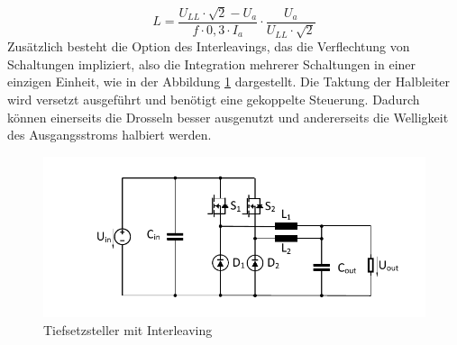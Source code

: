 		\begin{equation}
			\label{eq:BuckLB6}
			L=\dfrac{U_{LL} \cdot \sqrt{2}-U_{a}}{f\cdot 0,3 \cdot I_{a}}\cdot \dfrac{U_{a}}{U_{LL} \cdot \sqrt{2}}
		\end{equation}
		Zusätzlich besteht die Option des Interleavings, das die Verflechtung von Schaltungen impliziert, also die Integration mehrerer Schaltungen in einer einzigen Einheit, wie in der Abbildung \ref{fig:buckinterleaved} dargestellt. Die Taktung der Halbleiter wird versetzt ausgeführt und benötigt eine gekoppelte Steuerung. Dadurch können einerseits die Drosseln besser ausgenutzt und andererseits die Welligkeit des Ausgangsstroms halbiert werden. 
		\begin{figure}
			\centering
			\includegraphics[width=0.7\linewidth]{content/Grafiken/Buck_interleaved}
			\caption{Tiefsetzsteller mit Interleaving}
			\label{fig:buckinterleaved}
		\end{figure}
		
		

